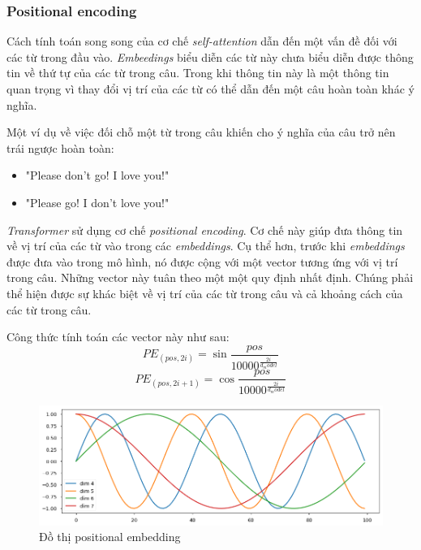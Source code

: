 \subsubsection{Positional encoding}

Cách tính toán song song của cơ chế \textit{self-attention} dẫn đến một vấn đề đối với các từ trong đầu vào. \textit{Embeedings} biểu diễn các từ này chưa biểu diễn được thông tin về thứ tự của các từ trong câu. Trong khi thông tin này là một thông tin quan trọng vì thay đổi vị trí của các từ có thể dẫn đến một câu hoàn toàn khác ý nghĩa.

Một ví dụ về việc đối chỗ một từ trong câu khiến cho ý nghĩa của câu trở nên trái ngược hoàn toàn:
\begin{itemize}
	\item "Please don't go! I love you!"
	\item "Please go! I don't love you!"
\end{itemize}

 \textit{Transformer}  sử dụng cơ chế \textit{positional encoding}. Cơ chế này giúp đưa thông tin về vị trí của các từ vào trong các \textit{embeddings}. Cụ thể hơn, trước khi \textit{embeddings} được đưa vào trong mô hình, nó được cộng với một vector tương ứng với vị trí trong câu. Những vector này tuân theo một một quy định nhất định. Chúng phải thể hiện được sự khác biệt về vị trí của các từ trong câu và cả khoảng cách của các từ trong câu. 

Công thức tính toán các vector này như sau: 
\begin{equation*}
	PE_{(pos, 2i)} = \sin{\frac{pos}{10000^{\frac{2i}{d_model}}}}
\end{equation*}
\begin{equation*}
	PE_{(pos, 2i+1)} = \cos{\frac{pos}{10000^{\frac{2i}{d_model}}}}
\end{equation*}

\begin{figure}[H]
    \begin{center}
        \includegraphics[scale=0.5]{images/positional-embedding}
        \caption{Đồ thị positional embedding \cite{annotated.transformer}}
        \label{fig:positional embedding}
    \end{center}
\end{figure}



